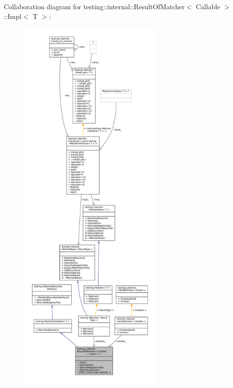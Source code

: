 Collaboration diagram for testing\+:\+:internal\+:\+:Result\+Of\+Matcher$<$ Callable $>$\+:\+:Impl$<$ T $>$\+:
\nopagebreak
\begin{figure}[H]
\begin{center}
\leavevmode
\includegraphics[height=550pt]{classtesting_1_1internal_1_1ResultOfMatcher_1_1Impl__coll__graph}
\end{center}
\end{figure}
